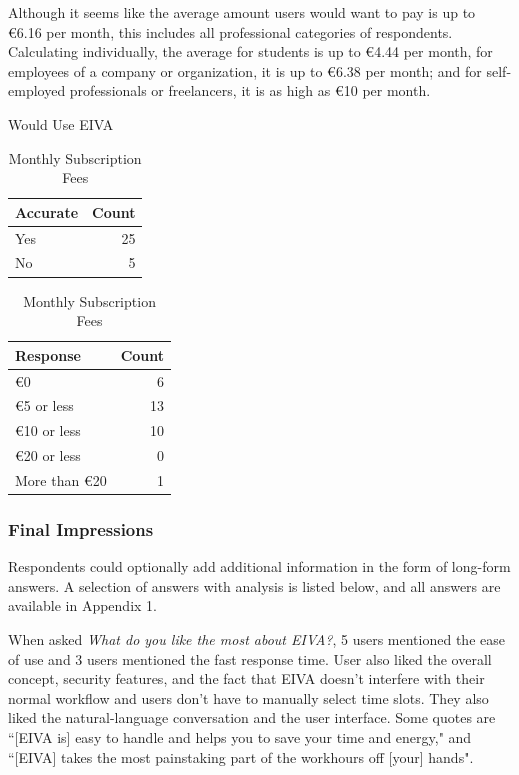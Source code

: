 \documentclass{article}
\begin{document}
Although it seems like the average amount users would want to pay is up to €6.16 per month, this includes all professional categories of respondents. Calculating individually, the average for students is up to €4.44 per month, for employees of a company or organization, it is up to €6.38 per month; and for self-employed professionals or freelancers, it is as high as €10 per month.

\begin{table}[!htb]
	\begin{minipage}{.5\linewidth}
		\caption{Would Use EIVA}
		\centering
		\begin{tabular}{lr}
			\hline
			\textbf{Accurate} & \textbf{Count} \\
			\hline
			Yes               & 25             \\
			No                & 5              \\
			\hline
		\end{tabular}
	\end{minipage}%
	\hspace{.1cm}
	\begin{minipage}{.5\linewidth}
		\centering
		\caption{Monthly Subscription Fees}
		\begin{tabular}{lr}
			\hline
			\textbf{Response} & \textbf{Count} \\
			\hline
			€0              & 6              \\
			€5 or less      & 13             \\
			€10 or less     & 10             \\
			€20 or less     & 0              \\
			More than €20   & 1              \\
			\hline
		\end{tabular}
	\end{minipage}
\end{table}

\subsubsection{Final Impressions}

Respondents could optionally add additional information in the form of long-form answers. A selection of answers with analysis is listed below, and all answers are available in Appendix 1.

When asked \emph{What do you like the most about EIVA?}, 5 users mentioned the ease of use and 3 users mentioned the fast response time. User also liked the overall concept, security features, and the fact that EIVA doesn't interfere with their normal workflow and users don't have to manually select time slots. They also liked the natural-language conversation and the user interface. Some quotes are ``[EIVA is] easy to handle and helps you to save your time and energy," and ``[EIVA] takes the most painstaking part of the workhours off [your] hands".
\end{document}
